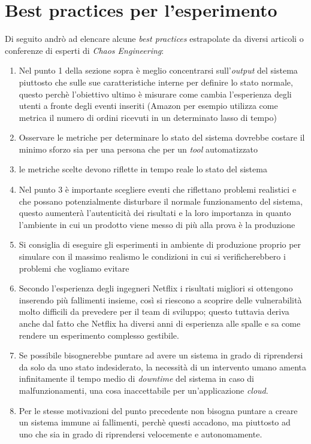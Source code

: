 \section{Best practices per l'esperimento}
Di seguito andrò ad elencare alcune \textit{best practices} estrapolate da diversi articoli o conferenze di esperti di \textit{Chaos Engineering}:
\begin{enumerate}
    \item Nel punto 1 della sezione sopra è meglio concentrarsi sull'\textit{output} del sistema piuttosto che sulle sue caratteristiche interne per definire lo stato normale, questo perchè l'obiettivo ultimo è misurare come cambia l'esperienza degli utenti a fronte degli eventi inseriti (Amazon per esempio utilizza come metrica il numero di ordini ricevuti in un determinato lasso di tempo)
    \item Osservare le metriche per determinare lo stato del sistema dovrebbe costare il minimo sforzo sia per una persona che per un \textit{tool} automatizzato
    \item le metriche scelte devono riflette in tempo reale lo stato del sistema
    \item Nel punto 3 è importante scegliere eventi che riflettano problemi realistici e che possano potenzialmente disturbare il normale funzionamento del sistema, questo aumenterà l'autenticità dei risultati e la loro importanza in quanto l'ambiente in cui un prodotto viene messo di più alla prova è la produzione
    \item Si consiglia di eseguire gli esperimenti in ambiente di produzione proprio per simulare con il massimo realismo le condizioni in cui si verificherebbero i problemi che vogliamo evitare
    \item Secondo l'esperienza degli ingegneri Netflix i risultati migliori si ottengono inserendo più fallimenti insieme, così si riescono a scoprire delle vulnerabilità molto difficili da prevedere per il team di sviluppo; questo tuttavia deriva anche dal fatto che Netflix ha diversi anni di esperienza alle spalle e sa come rendere un esperimento complesso gestibile.
    \item Se possibile bisognerebbe puntare ad avere un sistema in grado di riprendersi da solo da uno stato indesiderato, la necessità di un intervento umano amenta infinitamente il tempo medio di \textit{downtime} del sistema in caso di malfunzionamenti, una cosa inaccettabile per un'applicazione \textit{cloud}.
    \item Per le stesse motivazioni del punto precedente non bisogna puntare a creare un sistema immune ai fallimenti, perchè questi accadono, ma piuttosto ad uno che sia in grado di riprendersi velocemente e autonomamente.
\end{enumerate}

